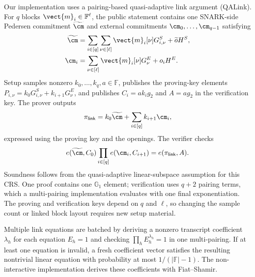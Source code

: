 Our implementation uses a pairing-based quasi-adaptive link argument
(QALink).  For \(q\) blocks \(\vect{m}_i\in\mathbb{F}^{\ell}\), the public
statement contains one SNARK-side Pedersen commitment \(\widetilde{\cm}\) and
external commitments \(\cm_0,\ldots,\cm_{q-1}\) satisfying
\[
\begin{aligned}
\widetilde{\cm}
 &=\sum_{i\in[q]}\sum_{\nu\in[\ell]}
   \vect{m}_i[\nu]G^S_{i,\nu}+\widetilde{o}H^S,\\
\cm_i
 &=\sum_{\nu\in[\ell]}\vect{m}_i[\nu]G^E_\nu+o_iH^E.
\end{aligned}
\]
Setup samples nonzero \(k_0,\ldots,k_q,a\in\mathbb{F}\), publishes the
proving-key elements
\(P_{i,\nu}=k_0G^S_{i,\nu}+k_{i+1}G^E_\nu\), and publishes
\(C_i=ak_ig_2\) and \(A=ag_2\) in the verification key.  The prover outputs
\[
 \pi_{\mathsf{link}}
 =k_0\widetilde{\cm}+\sum_{i\in[q]}k_{i+1}\cm_i,
\]
expressed using the proving key and the openings.  The verifier checks
\[
 e(\widetilde{\cm},C_0)
 \prod_{i\in[q]}e(\cm_i,C_{i+1})
 =e(\pi_{\mathsf{link}},A).
\]
Soundness follows from the quasi-adaptive linear-subspace assumption for this
CRS.  One proof contains one \(\mathbb{G}_1\) element; verification uses
\(q+2\) pairing terms, which a multi-pairing implementation evaluates with one
final exponentiation.  The proving and verification keys depend on \(q\) and
\(\ell\), so changing the sample count or linked block layout requires new
setup material.

Multiple link equations are batched by deriving a nonzero transcript
coefficient \(\lambda_h\) for each equation \(E_h=1\) and checking
\(\prod_h E_h^{\lambda_h}=1\) in one multi-pairing.  If at least one equation
is invalid, a fresh coefficient vector satisfies the resulting nontrivial
linear equation with probability at most \(1/(|\mathbb{F}|-1)\).  The
non-interactive implementation derives these coefficients with Fiat--Shamir.
